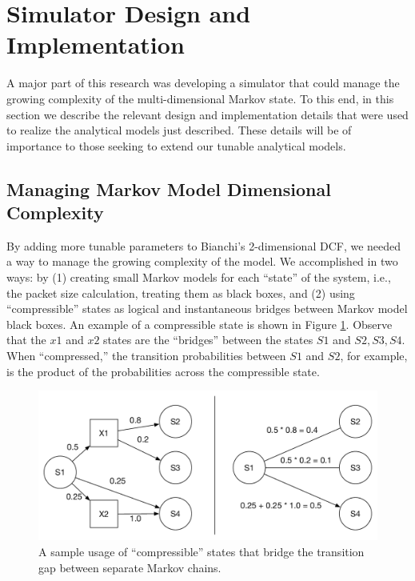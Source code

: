 \documentclass[conference]{IEEEtran}
\begin{document}
\section{Simulator Design and Implementation}
A major part of this research was developing a simulator that could manage the growing complexity of the multi-dimensional Markov state. To this end, in this section we describe the relevant design and implementation details that were used to realize the analytical models just described. These details will be of importance to those seeking to extend our tunable analytical models. 

\subsection{Managing Markov Model Dimensional Complexity}
By adding more tunable parameters to Bianchi's 2-dimensional DCF, we needed a way to manage the growing complexity of the model. We accomplished in two ways: by (1) creating small Markov models for each ``state'' of the system, i.e., the packet size calculation, treating them as black boxes, and (2) using ``compressible'' states as logical and instantaneous bridges between Markov model black boxes. An example of a compressible state is shown in Figure \ref{fig:collapses}. Observe that the $x1$ and $x2$ states are the ``bridges'' between the states $S1$ and $S2,S3,S4$. When ``compressed,'' the transition probabilities between $S1$ and $S2$, for example, is the product of the probabilities across the compressible state. 

\begin{figure}
\begin{center}
\includegraphics[scale=0.4]{../../sketches/collapses.pdf}
\caption{A sample usage of ``compressible'' states that bridge the transition gap between separate Markov chains.}
\label{fig:collapses}
\end{center}
\end{figure}
\end{document}
